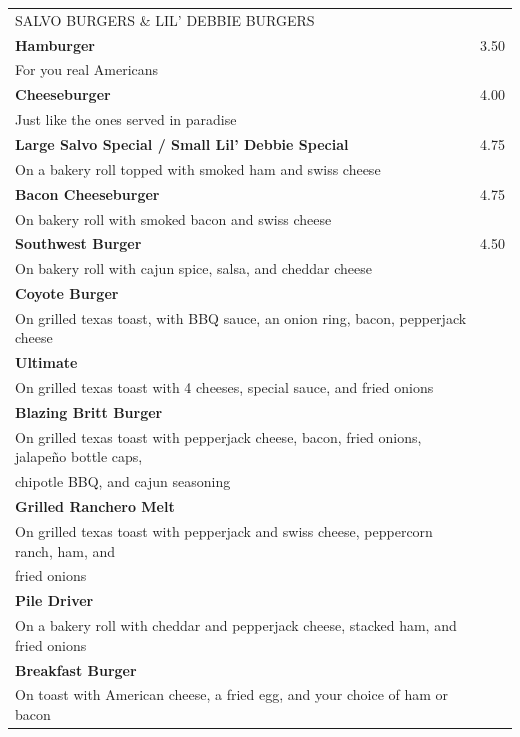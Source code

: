 \documentclass[10pt,notitlepage]{article}
\makeatletter
\newcommand*\ColText[1]{\uppercase{#1}}
\newenvironment{Group}[1]
	{\noindent\begin{tabular*}{\textwidth}{@{}p{.8\linewidth}@{\extracolsep{\fill}}r@{}}
		{\fontsize{16}{20}\selectfont\ColText{#1}}\\[0.8em]}
	{\end{tabular*}}
\newcommand*\Item[3]{%
	\sffamily\textbf{\large#1}\dotfill & {\large#2}\hspace*{0.5cm}{\large#3}}
\newcommand*\Desc[1]{%
	\sffamily\hspace*{0.5cm}#1}
\makeatother
\begin{document}
\thispagestyle{first}

	\begin{Group}{Salvo Burgers \& Lil' Debbie Burgers}
		\Item{Hamburger}{3.50}{5.50} \\
		\Desc{For you real Americans} \\
		\Item{Cheeseburger}{4.00}{6.00} \\
		\Desc{Just like the ones served in paradise} \\
		\Item{Large Salvo Special / Small Lil' Debbie Special}{4.75}{7.00} \\
		\Desc{On a bakery roll topped with smoked ham and swiss cheese} \\
		\Item{Bacon Cheeseburger}{4.75}{7.00} \\
		\Desc{On bakery roll with smoked bacon and swiss cheese} \\
		\Item{Southwest Burger}{4.50}{7.00} \\
		\Desc{On bakery roll with cajun spice, salsa, and cheddar cheese} \\
		\Item{Coyote Burger}{}{7.50} \\
		\Desc{On grilled texas toast, with BBQ sauce, an onion ring, bacon, pepperjack cheese} \\
		\Item{Ultimate}{}{7.50} \\
		\Desc{On grilled texas toast with 4 cheeses, special sauce, and fried onions} \\
		\Item{Blazing Britt Burger}{}{7.50} \\
		\Desc{On grilled texas toast with pepperjack cheese, bacon, fried onions, jalape\~{n}o bottle caps, \\\sffamily\hspace*{0.5cm}chipotle BBQ, and cajun seasoning} \\
		\Item{Grilled Ranchero Melt}{}{7.50} \\
		\Desc{On grilled texas toast with pepperjack and swiss cheese, peppercorn ranch, ham, and \\\sffamily\hspace*{0.5cm}fried onions} \\
		\Item{Pile Driver}{}{7.50} \\
		\Desc{On a bakery roll with cheddar and pepperjack cheese, stacked ham, and fried onions} \\
		\Item{Breakfast Burger}{}{8.00} \\
		\Desc{On toast with American cheese, a fried egg, and your choice of ham or bacon} \\
	\end{Group}
\end{document}
